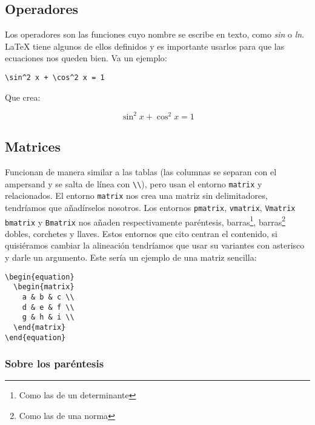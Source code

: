 \subsection{Operadores}\label{sec:operadores}

Los operadores son las funciones cuyo nombre se escribe en texto, como
\emph{sin} o \emph{ln}. LaTeX tiene algunos de ellos definidos y es
importante usarlos para que las ecuaciones nos queden bien. Va un
ejemplo:

\begin{lstlisting}[language={[latex]tex}]
\sin^2 x + \cos^2 x = 1
\end{lstlisting}

Que crea:

\begin{equation*}
\sin^2 x + \cos^2 x = 1
\end{equation*}

\subsection{Matrices}\label{sec:matrices}

Funcionan de manera similar a las tablas (las columnas se separan con el
ampersand y se salta de línea con \lstinline!\\!), pero usan el entorno
\lstinline!matrix! y relacionados. El entorno \lstinline!matrix! nos
crea una matriz sin delimitadores, tendríamos que añadírselos nosotros.
Los entornos \lstinline!pmatrix!, \lstinline!vmatrix!,
\lstinline!Vmatrix! \lstinline!bmatrix! y \lstinline!Bmatrix! nos añaden
respectivamente paréntesis, barras\footnote{Como las de un determinante},
barras\footnote{Como las de una norma} dobles, corchetes y llaves. Estos
entornos que cito centran el contenido, si quisiéramos cambiar la
alineación tendríamos que usar su variantes con asterisco y darle un
argumento. Este sería un ejemplo de una matriz sencilla:

\begin{lstlisting}[language={[latex]tex}]
\begin{equation}
  \begin{matrix}
    a & b & c \\
    d & e & f \\
    g & h & i \\
  \end{matrix}
\end{equation}
\end{lstlisting}

\subsubsection{Sobre los paréntesis}\label{sec:parentesis}

